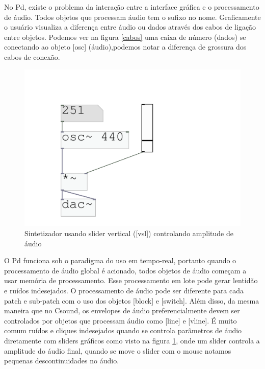 \documentclass[draft]{ppgmus}
\begin{document}
No Pd, existe o problema da interação entre a interface gráfica e 
o processamento de áudio. Todos objetos que processam áudio tem o sufixo \texttildelow no
nome. Graficamente o usuário visualiza a diferença
entre áudio ou dados através dos cabos de ligação entre objetos. Podemos
ver na figura \ref{cabos} uma caixa de número (dados) se conectando ao objeto [osc\texttildelow]
(áudio),podemos notar a diferença de grossura dos cabos de conexão.

\begin{figure}
\includegraphics[scale=.6]{line}
\caption{Sintetizador usando slider vertical ([vsl]) controlando amplitude de áudio}
\label{line}
\end{figure}


O Pd funciona sob o paradigma do uso em tempo-real,
portanto quando o processamento de áudio global é acionado, 
todos objetos de áudio começam a usar memória de processamento.
Esse processamento em lote pode gerar lentidão e ruídos indesejados.
O processamento de áudio pode ser diferente para
cada patch e sub-patch com o uso dos objetos [block\texttildelow] e
[switch\texttildelow]. Além disso, da mesma maneira que no Csound, os
envelopes de áudio preferencialmente devem ser controlados
por objetos que processam áudio como [line\texttildelow] e [vline\texttildelow].
É muito comum ruídos e cliques indesejados quando se controla parâmetros
de áudio diretamente com sliders gráficos como visto na figura \ref{line}, onde 
um slider controla a amplitude do áudio final, quando se move o slider com o mouse
notamos pequenas descontinuidades no áudio. 
\end{document}
